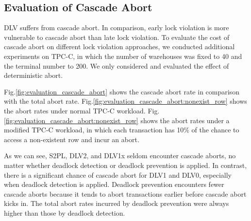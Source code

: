 \documentclass[conference]{IEEEtran}
\begin{document}
\subsection{Evaluation of Cascade Abort}
DLV suffers from cascade abort. In comparison, early lock violation is more vulnerable to cascade abort than
late lock violation.
To evaluate the cost of cascade abort on different lock violation approaches, we conducted additional experiments on TPC-C, in which the number of warehouses was fixed to 40  and the terminal number to 200.
We only considered and evaluated the effect of deterministic abort.

Fig.\ref{fig:evaluation_cascade_abort} shows the cascade abort rate in comparison with the total abort rate.
Fig.\ref{fig:evaluation_cascade_abort:nonexist_row}
shows the abort rates under normal TPC-C workload.
Fig.\ref{fig:evaluation_cascade_abort:nonexist_row} 
shows the abort rates under a modified TPC-C workload, in which each transaction has 10\% of the chance to access a non-existent row and incur an abort. 
 
As we can see, S2PL, DLV2, and DLV1x seldom encounter cascade aborts, no matter whether deadlock detection or deadlock prevention is applied. 
In contrast, there is a significant chance of cascade abort for DLV1 and DLV0, especially when deadlock detection is applied. Deadlock prevention encounters fewer cascade aborts because it tends to abort transactions earlier before cascade abort kicks in. The total abort rates incurred by deadlock prevention were always higher than those by deadlock detection.

\end{document}

